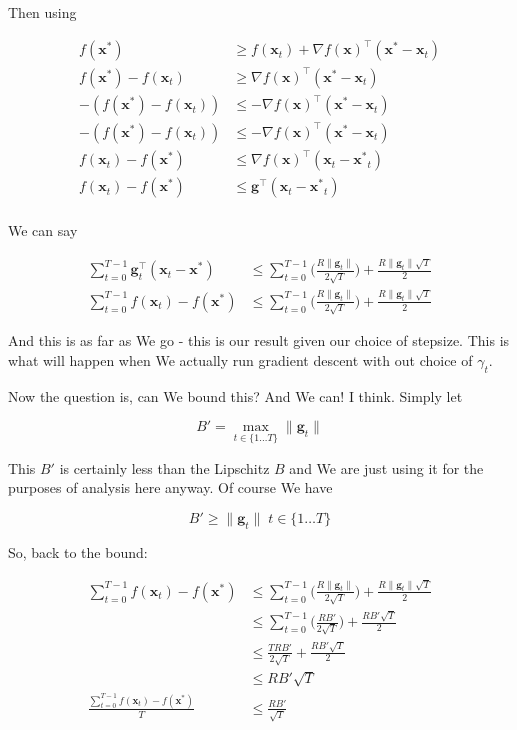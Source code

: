 \documentclass{article}
\begin{document}
Then using

\begin{align*}
	f(\mathbf{x}^*) &\ge f(\mathbf{x}_t) + \nabla f(\mathbf{x})^\top (\mathbf{x^*-\mathbf{x}}_t)\\
	f(\mathbf{x}^*) - f(\mathbf{x}_t) &\ge  \nabla f(\mathbf{x})^\top (\mathbf{x^*-\mathbf{x}}_t)\\
	-( f(\mathbf{x}^*) - f(\mathbf{x}_t)) &\le  - \nabla f(\mathbf{x})^\top (\mathbf{x^*-\mathbf{x}}_t)\\
	-( f(\mathbf{x}^*) - f(\mathbf{x}_t)) &\le  - \nabla f(\mathbf{x})^\top (\mathbf{x^*-\mathbf{x}}_t)\\
	f(\mathbf{x}_t) - f(\mathbf{x}^*)&\le  \nabla f(\mathbf{x})^\top (\mathbf{x}_t - \mathbf{x^*}_t)\\
	f(\mathbf{x}_t) - f(\mathbf{x}^*)&\le  \mathbf{g}^\top (\mathbf{x}_t - \mathbf{x^*}_t)\\
\end{align*}

We can say

\begin{align*}
	\sum^{T-1}_{t=0} \mathbf{g}_t^\top (\mathbf{x}_t - \mathbf{x}^*) &\le \sum^{T-1}_{t=0} \bigg( \frac{R \|\mathbf{g}_t\| }{2 \sqrt{T}} \bigg) +\frac{R \|\mathbf{g}_t\| \sqrt{T}}{2}\\
	\sum^{T-1}_{t=0} f(\mathbf{x}_t) - f(\mathbf{x}^*) &\le \sum^{T-1}_{t=0} \bigg( \frac{R \|\mathbf{g}_t\| }{2 \sqrt{T}} \bigg) +\frac{R \|\mathbf{g}_t\| \sqrt{T}}{2}		
\end{align*}

And this is as far as We go - this is our result given our choice of stepsize. This is what will happen when We actually run gradient descent with out choice of $\gamma_t$.

Now the question is, can We bound this? And We can! I think. Simply let

\[ B' = \max_{t\in \{1\ldots T \}} \|\mathbf{g}_t\| \]

This  $B'$ is certainly less than the Lipschitz $B$ and We are just using it for the purposes of analysis here anyway. Of course We have

\[ B' \ge \|\mathbf{g}_t\|\; t\in\{1\ldots T\} \]	

So, back to the bound:

\begin{align*}
	\sum^{T-1}_{t=0} f(\mathbf{x}_t) - f(\mathbf{x}^*) &\le \sum^{T-1}_{t=0} \bigg( \frac{R \|\mathbf{g}_t\| }{2 \sqrt{T}} \bigg) +\frac{R \|\mathbf{g}_t\| \sqrt{T}}{2}	\\
	&\le \sum^{T-1}_{t=0} \bigg( \frac{R B' }{2 \sqrt{T}} \bigg) +\frac{R B' \sqrt{T}}{2}	\\
	&\le \frac{T R B' }{2 \sqrt{T}}+\frac{R B' \sqrt{T}}{2}	\\
	&\le R B' \sqrt{T}\\
	\frac{\sum^{T-1}_{t=0} f(\mathbf{x}_t) - f(\mathbf{x}^*)}{T} &\le \frac{R B'}{\sqrt{T}}
\end{align*}
\end{document}
